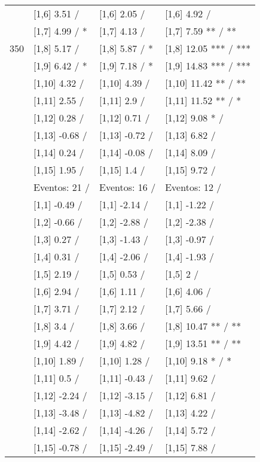 \begin{table}
\begin{tabular}[t]{llll}
 & {}[1,6] 3.51  / & {}[1,6] 2.05  / & {}[1,6] 4.92  /\\
 & {}[1,7] 4.99  / * & {}[1,7] 4.13  / & {}[1,7] 7.59 ** / **\\
350 & {}[1,8] 5.17  / & {}[1,8] 5.87  / * & {}[1,8] 12.05 *** / ***\\
\addlinespace
 & {}[1,9] 6.42  / * & {}[1,9] 7.18  / * & {}[1,9] 14.83 *** / ***\\
 & {}[1,10] 4.32  / & {}[1,10] 4.39  / & {}[1,10] 11.42 ** / **\\
 & {}[1,11] 2.55  / & {}[1,11] 2.9  / & {}[1,11] 11.52 ** / *\\
 & {}[1,12] 0.28  / & {}[1,12] 0.71  / & {}[1,12] 9.08 * /\\
 & {}[1,13] -0.68  / & {}[1,13] -0.72  / & {}[1,13] 6.82  /\\
\addlinespace
 & {}[1,14] 0.24  / & {}[1,14] -0.08  / & {}[1,14] 8.09  /\\
 & {}[1,15] 1.95  / & {}[1,15] 1.4  / & {}[1,15] 9.72  /\\
 & Eventos:  21 / & Eventos:  16 / & Eventos:  12 /\\
 & {}[1,1] -0.49  / & {}[1,1] -2.14  / & {}[1,1] -1.22  /\\
 & {}[1,2] -0.66  / & {}[1,2] -2.88  / & {}[1,2] -2.38  /\\
\addlinespace
 & {}[1,3] 0.27  / & {}[1,3] -1.43  / & {}[1,3] -0.97  /\\
 & {}[1,4] 0.31  / & {}[1,4] -2.06  / & {}[1,4] -1.93  /\\
 & {}[1,5] 2.19  / & {}[1,5] 0.53  / & {}[1,5] 2  /\\
 & {}[1,6] 2.94  / & {}[1,6] 1.11  / & {}[1,6] 4.06  /\\
 & {}[1,7] 3.71  / & {}[1,7] 2.12  / & {}[1,7] 5.66  /\\
\addlinespace
500 & {}[1,8] 3.4  / & {}[1,8] 3.66  / & {}[1,8] 10.47 ** / **\\
 & {}[1,9] 4.42  / & {}[1,9] 4.82  / & {}[1,9] 13.51 ** / **\\
 & {}[1,10] 1.89  / & {}[1,10] 1.28  / & {}[1,10] 9.18 * / *\\
 & {}[1,11] 0.5  / & {}[1,11] -0.43  / & {}[1,11] 9.62  /\\
 & {}[1,12] -2.24  / & {}[1,12] -3.15  / & {}[1,12] 6.81  /\\
\addlinespace
 & {}[1,13] -3.48  / & {}[1,13] -4.82  / & {}[1,13] 4.22  /\\
 & {}[1,14] -2.62  / & {}[1,14] -4.26  / & {}[1,14] 5.72  /\\
 & {}[1,15] -0.78  / & {}[1,15] -2.49  / & {}[1,15] 7.88  /\\
\bottomrule
\end{tabular}
\end{table}
